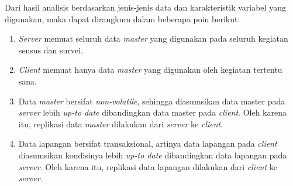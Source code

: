 Dari hasil analisis berdasarkan jenis-jenis data dan karakteristik variabel yang digunakan, maka dapat dirangkum dalam beberapa poin berikut:

\begin{enumerate}
\item \textit{Server} memuat seluruh data \textit{master} yang digunakan pada seluruh kegiatan sensus dan survei.
\item \textit{Client} memuat hanya data \textit{master} yang digunakan oleh kegiatan tertentu sana.
\item Data \textit{master} bersifat \textit{non-volatile}, sehingga diasumsikan data master pada \textit{server} lebih \textit{up-to date} dibandingkan data master pada \textit{client}. Oleh karena itu, replikasi data \textit{master} dilakukan dari \textit{server} ke \textit{client}.
\item Data lapangan bersifat transaksional, artinya data lapangan pada \textit{client} diasumsikan kondisinya lebih \textit{up-to date} dibandingkan data lapangan pada \textit{server}. Oleh karena itu, replikasi data lapangan dilakukan dari \textit{client} ke \textit{server}.
\end{enumerate}
